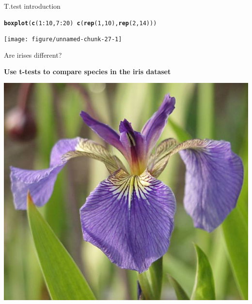 \documentclass[10pt]{beamer}\usepackage[]{graphicx}\usepackage[]{color}
\makeatletter
\newcommand{\hlnum}[1]{\textcolor[rgb]{0.686,0.059,0.569}{#1}}%
\newcommand{\hlopt}[1]{\textcolor[rgb]{0,0,0}{#1}}%
\newcommand{\hlstd}[1]{\textcolor[rgb]{0.345,0.345,0.345}{#1}}%
\newcommand{\hlkwd}[1]{\textcolor[rgb]{0.737,0.353,0.396}{\textbf{#1}}}%
\newenvironment{kframe}{%
 \def\at@end@of@kframe{}%
 \ifinner\ifhmode%
  \def\at@end@of@kframe{\end{minipage}}%
  \begin{minipage}{\columnwidth}%
 \fi\fi%
 \def\FrameCommand##1{\hskip\@totalleftmargin \hskip-\fboxsep
 \colorbox{shadecolor}{##1}\hskip-\fboxsep
     \hskip-\linewidth \hskip-\@totalleftmargin \hskip\columnwidth}%
 \MakeFramed {\advance\hsize-\width
   \@totalleftmargin\z@ \linewidth\hsize
   \@setminipage}}%
 {\par\unskip\endMakeFramed%
 \at@end@of@kframe}
\newenvironment{knitrout}{}{} %
\makeatother
\begin{document}
\begin{frame}[fragile]{T.test introduction}%

\begin{knitrout}
\color{fgcolor}\begin{kframe}
\begin{alltt}
  \hlkwd{boxplot}\hlstd{(}\hlkwd{c}\hlstd{(}\hlnum{1}\hlopt{:}\hlnum{10}\hlstd{,} \hlnum{7}\hlopt{:}\hlnum{20}\hlstd{)} \hlopt{~} \hlkwd{c}\hlstd{(}\hlkwd{rep}\hlstd{(}\hlnum{1}\hlstd{,}\hlnum{10}\hlstd{),} \hlkwd{rep}\hlstd{(}\hlnum{2}\hlstd{,} \hlnum{14}\hlstd{)))}
\end{alltt}
\end{kframe}
\texttt{[image: figure/unnamed-chunk-27-1]} 

\end{knitrout}
\end{frame}

\begin{frame}[fragile]{Are irises different?}

  \textbf{Use t-tests to compare species in the iris dataset}
  
  \begin{center}
    \includegraphics[height=0.6\textwidth]{Figures/iris}
  \end{center}
\end{frame}
\end{document}
